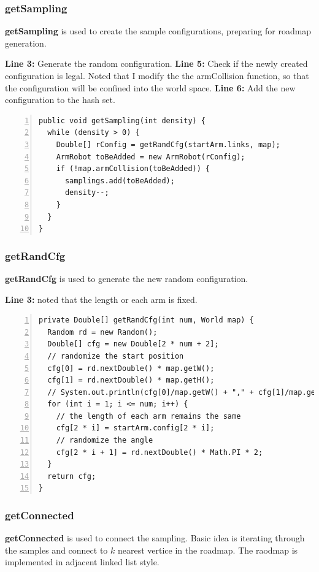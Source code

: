 \documentclass{article}
\begin{document}
\subsubsection{getSampling}

\textbf{getSampling} is used to create the sample configurations, preparing for roadmap generation.

\textbf{Line 3:} Generate the random configuration.
\textbf{Line 5:} Check if the newly created configuration is legal. Noted that I modify the the armCollision function, so that the configuration will be confined into the world space.
\textbf{Line 6:} Add the new configuration to the hash set.

\begin{lstlisting}[numbers=left]
public void getSampling(int density) {
  while (density > 0) {
    Double[] rConfig = getRandCfg(startArm.links, map);
    ArmRobot toBeAdded = new ArmRobot(rConfig);
    if (!map.armCollision(toBeAdded)) {
      samplings.add(toBeAdded);
      density--;
    }
  }
}
\end{lstlisting}

\subsubsection{getRandCfg}

\textbf{getRandCfg} is used to generate the new random configuration.

\textbf{Line 3:} noted that the length or each arm is fixed.

\begin{lstlisting}[numbers=left]
private Double[] getRandCfg(int num, World map) {
  Random rd = new Random();
  Double[] cfg = new Double[2 * num + 2];
  // randomize the start position
  cfg[0] = rd.nextDouble() * map.getW();
  cfg[1] = rd.nextDouble() * map.getH();
  // System.out.println(cfg[0]/map.getW() + "," + cfg[1]/map.getH());
  for (int i = 1; i <= num; i++) {
    // the length of each arm remains the same
    cfg[2 * i] = startArm.config[2 * i];
    // randomize the angle
    cfg[2 * i + 1] = rd.nextDouble() * Math.PI * 2;
  }
  return cfg;
}
\end{lstlisting}

\subsubsection{getConnected}

\textbf{getConnected} is used to connect the sampling. Basic idea is iterating through the samples and connect to $k$ nearest vertice in the roadmap. The raodmap is implemented in adjacent linked list style.
\end{document}

